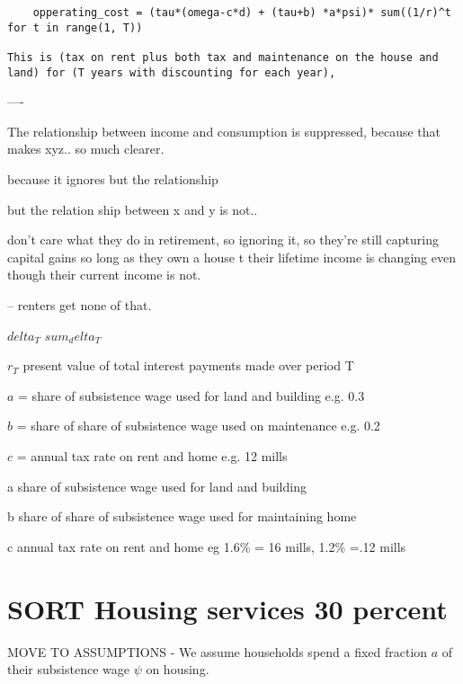 \begin{verbatim}
    opperating_cost = (tau*(omega-c*d) + (tau+b) *a*psi)* sum((1/r)^t for t in range(1, T))
    
This is (tax on rent plus both tax and maintenance on the house and land) for (T years with discounting for each year),
\end{verbatim}



----


The relationship between income and consumption is suppressed, because that makes xyz.. so much clearer.

because it ignores
but the relationship

but the relation ship between x and y is not..

don't care what they do in retirement, so ignoring it, so they're still capturing capital gains so long as they own a house
t
their lifetime income is changing even though their current income is not.

--
renters get none of that.



$delta_T$ 
$sum_delta_T$

$r_T$  present value of total interest payments made over period T




${a}$  =  share of subsistence wage  used for land and building e.g. 0.3

${b}$  = share of share of subsistence wage  used on maintenance e.g. 0.2

${c}$  = annual tax rate on rent and home  e.g. 12 mills 


a     share of subsistence wage  used for land and building

b      share of share of subsistence wage used for maintaining home

c    annual tax rate on rent and home  eg  1.6\% = 16 mills, 1.2\% =.12 mills


\section{SORT Housing services 30 percent}
MOVE TO ASSUMPTIONS - We assume households spend a fixed fraction $a$ of their subsistence wage $\psi$ on housing. 

